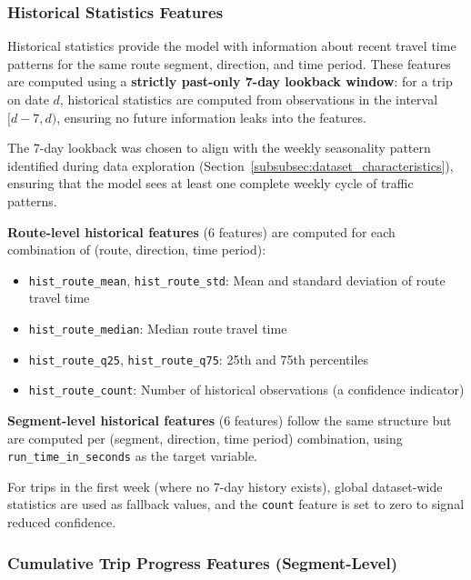 \subsubsection{Historical Statistics Features}
\label{subsubsec:historical_features}

Historical statistics provide the model with information about recent travel time patterns for the same route segment, direction, and time period. These features are computed using a \textbf{strictly past-only 7-day lookback window}: for a trip on date $d$, historical statistics are computed from observations in the interval $[d-7, d)$, ensuring no future information leaks into the features.

The 7-day lookback was chosen to align with the weekly seasonality pattern identified during data exploration (Section~\ref{subsubsec:dataset_characteristics}), ensuring that the model sees at least one complete weekly cycle of traffic patterns.

\textbf{Route-level historical features} (6 features) are computed for each combination of (route, direction, time period):
\begin{itemize}
    \item \texttt{hist\_route\_mean}, \texttt{hist\_route\_std}: Mean and standard deviation of route travel time
    \item \texttt{hist\_route\_median}: Median route travel time
    \item \texttt{hist\_route\_q25}, \texttt{hist\_route\_q75}: 25th and 75th percentiles
    \item \texttt{hist\_route\_count}: Number of historical observations (a confidence indicator)
\end{itemize}

\textbf{Segment-level historical features} (6 features) follow the same structure but are computed per (segment, direction, time period) combination, using \texttt{run\_time\_in\_seconds} as the target variable.

For trips in the first week (where no 7-day history exists), global dataset-wide statistics are used as fallback values, and the \texttt{count} feature is set to zero to signal reduced confidence.

\subsubsection{Cumulative Trip Progress Features (Segment-Level)}
\label{subsubsec:cumulative_features}


